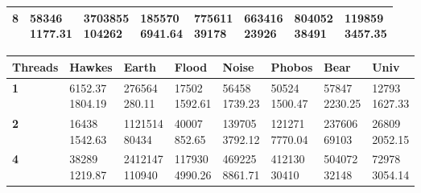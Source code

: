 \documentclass[letterpaper]{article}
\begin{document}
\begin{center}
\begin{tabular}{ |m{5em}|m{5em}|m{5em}|m{5em}|m{5em}|m{5em}|m{5em}|m{5em}| }
	\textbf{8}& \makecell{58346 \\[-0.5em] 1177.31}& \makecell{3703855 \\[-0.5em] 104262}& \makecell{185570 \\[-0.5em] 6941.64}& \makecell{775611 \\[-0.5em] 39178}& \makecell{663416 \\[-0.5em] 23926}& \makecell{804052 \\[-0.5em] 38491}& \makecell{119859 \\[-0.5em] 3457.35}\\ \hline
	\end{tabular} \end{center} 


	\begin{center}
	\begin{tabular}{ |m{5em}|m{5em}|m{5em}|m{5em}|m{5em}|m{5em}|m{5em}|m{5em}| }
	\hline
	\textbf{Threads} & \textbf{Hawkes} & \textbf{Earth} & \textbf{Flood} & \textbf{Noise} & \textbf{Phobos} & \textbf{Bear} & \textbf{Univ} \\ \hline
	\textbf{1}& \makecell{6152.37 \\[-0.5em] 1804.19}& \makecell{276564 \\[-0.5em] 280.11}& \makecell{17502 \\[-0.5em] 1592.61}& \makecell{56458 \\[-0.5em] 1739.23}& \makecell{50524 \\[-0.5em] 1500.47}& \makecell{57847 \\[-0.5em] 2230.25}& \makecell{12793 \\[-0.5em] 1627.33}\\ \hline
	\textbf{2}& \makecell{16438 \\[-0.5em] 1542.63}& \makecell{1121514 \\[-0.5em] 80434}& \makecell{40007 \\[-0.5em] 852.65}& \makecell{139705 \\[-0.5em] 3792.12}& \makecell{121271 \\[-0.5em] 7770.04}& \makecell{237606 \\[-0.5em] 69103}& \makecell{26809 \\[-0.5em] 2052.15}\\ \hline
	\textbf{4}& \makecell{38289 \\[-0.5em] 1219.87}& \makecell{2412147 \\[-0.5em] 110940}& \makecell{117930 \\[-0.5em] 4990.26}& \makecell{469225 \\[-0.5em] 8861.71}& \makecell{412130 \\[-0.5em] 30410}& \makecell{504072 \\[-0.5em] 32148}& \makecell{72978 \\[-0.5em] 3054.14}\\ \hline

\end{tabular}
\end{center}
\end{document}
